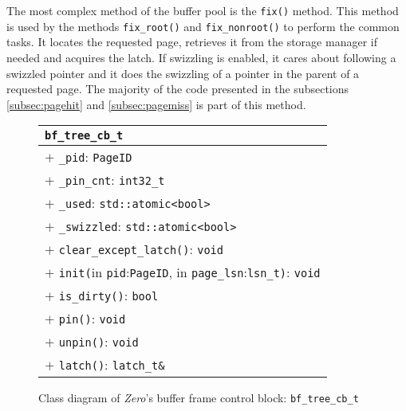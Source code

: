 	The most complex method of the buffer pool is the \lstinline{fix()} method. This method is used by the methods \lstinline{fix_root()} and \lstinline{fix_nonroot()} to perform the common tasks. It locates the requested page, retrieves it from the storage manager if needed and acquires the latch. If swizzling is enabled, it cares about following a swizzled pointer and it does the swizzling of a pointer in the parent of a requested page. The majority of the code presented in the subsections \ref{subsec:pagehit} and \ref{subsec:pagemiss} is part of this method.

\begin{@empty}
	\begin{figure}[ht!]
		\centering
		\scriptsize
		\setlength{\fboxsep}{0pt}
		\colorbox{listingsbackground}{\begin{tabularx}{\textwidth}{|X|}
			\hline
			\texttt{\textbf{bf\_tree\_cb\_t}}																																\\	\hline
			$+$ \texttt{\_pid}: \texttt{PageID}																															\\
			$+$ \texttt{\_pin\_cnt}: \texttt{int32\_t}																														\\
			$+$ \texttt{\_used}: \texttt{std::atomic<bool>}																													\\
			$+$ \texttt{\_swizzled}: \texttt{std::atomic<bool>}																												\\	\hline
			$+$ \texttt{clear\_except\_latch()}: \texttt{void}																													\\
			$+$ \texttt{init(}in \texttt{pid}:\texttt{PageID}, in \texttt{page\_lsn}:\texttt{lsn\_t)}: \texttt{void}																					\\
			$+$ \texttt{is\_dirty()}: \texttt{bool}																															\\
			$+$ \texttt{pin()}: \texttt{void}																																\\
			$+$ \texttt{unpin()}: \texttt{void}																																\\
			$+$ \texttt{latch()}: \texttt{latch\_t\&}																															\\	\hline
		\end{tabularx}}
        \vspace{.5em}
		\caption[Class diagram: Zero buffer frame control block]{Class diagram of \textit{Zero}'s buffer frame control block: \lstinline{bf_tree_cb_t}}
		\label{fig:cbdesign}
	\end{figure}
\end{@empty}

